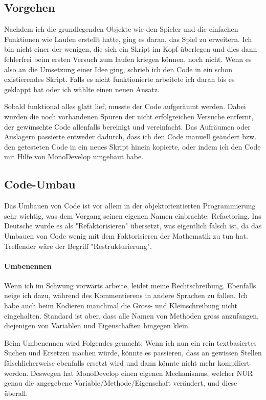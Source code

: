 \subsection{Vorgehen}
Nachdem ich die grundlegenden Objekte wie den Spieler und die einfachen Funktionen wie Laufen erstellt hatte, ging es daran, das Spiel zu erweitern. Ich bin nicht einer der wenigen, die sich ein Skript im Kopf überlegen und dies dann fehlerfrei beim ersten Versuch zum laufen kriegen können, noch nicht. Wenn es also an die Umsetzung einer Idee ging, schrieb ich den Code in ein schon existierendes Skript.
Falls es nicht funktionierte arbeitete ich daran bis es geklappt hat oder ich wählte einen neuen Ansatz.

Sobald funktional alles glatt lief, musste der Code aufgeräumt werden. Dabei wurden die noch vorhandenen Spuren der nicht erfolgreichen Versuche entfernt, der gewünschte Code allenfalls bereinigt und vereinfacht. Das Aufräumen oder Auslagern passierte entweder dadurch, dass ich den Code manuell geändert bzw. den getesteten Code in ein neues Skript hinein kopierte, oder indem ich den Code mit Hilfe von MonoDevelop umgebaut habe.

\subsection{Code-Umbau}
\label{subsubsec:refactoring}
Das Umbauen von Code ist vor allem in der objektorientierten Programmierung sehr wichtig, was dem Vorgang seinen eigenen Namen einbrachte: Refactoring. Ins Deutsche wurde es als "Refaktorisieren" übersetzt, was eigentlich falsch ist, da das Umbauen von Code wenig mit dem Faktorisieren der Mathematik zu tun hat.
Treffender wäre der Begriff "Restrukturierung".


\paragraph{Umbenennen}
Wenn ich im Schwung vorwärts arbeite, leidet meine Rechtschreibung. Ebenfalls neige ich dazu, während des Kommentierens in andere Sprachen zu fallen. Ich habe auch beim Kodieren manchmal die Gross- und Kleinschreibung nicht eingehalten. Standard ist aber, dass alle Namen von Methoden gross anzufangen, diejenigen von Variablen und Eigenschaften hingegen klein.

Beim Umbenennen wird Folgendes gemacht:
Wenn ich nun ein rein textbasiertes Suchen und Ersetzen machen würde, könnte es passieren, dass an gewissen Stellen fälschlicherweise ebenfalls ersetzt wird und dann könnte nicht mehr kompiliert werden. Deswegen hat MonoDevelop einen eigenen Mechanismus, welcher NUR genau die angegebene Variable/Methode/Eigenschaft verändert, und diese überall.

